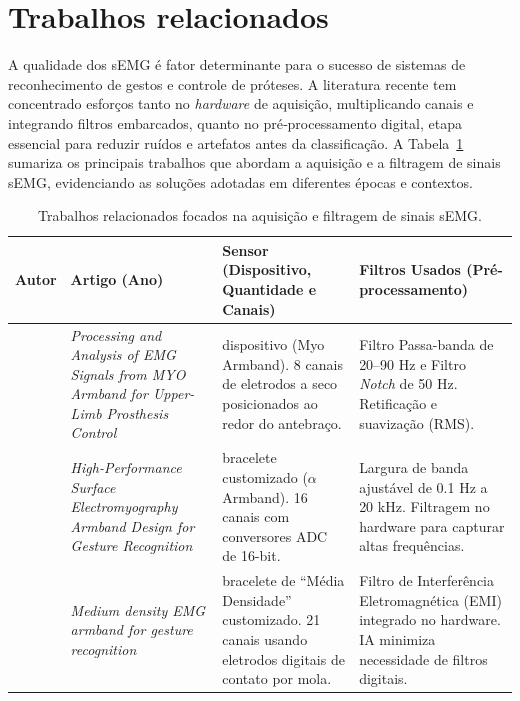 \section{Trabalhos relacionados}

A qualidade dos sEMG é fator determinante para o sucesso de sistemas de reconhecimento de gestos e controle de próteses. A literatura recente tem concentrado esforços tanto no \textit{hardware} de aquisição, multiplicando canais e integrando filtros embarcados, quanto no pré‑processamento digital, etapa essencial para reduzir ruídos e artefatos antes da classificação.
A Tabela~\ref{tab:aquisicao_semg} sumariza os principais trabalhos que abordam a aquisição e a filtragem de sinais sEMG, evidenciando as soluções adotadas em diferentes épocas e contextos.

\begin{table}[H]
    \centering
    \small
    \setlength{\extrarowheight}{3pt}
    \caption{Trabalhos relacionados focados na aquisição e filtragem de sinais sEMG.}
    \label{tab:aquisicao_semg}
    \begin{tabularx}{\textwidth}{@{} 
        >{\RaggedRight\arraybackslash}X 
        >{\RaggedRight\arraybackslash}X 
        >{\RaggedRight\arraybackslash}X 
        >{\RaggedRight\arraybackslash}X 
        @{}}
        \toprule
        \rowcolor{gray!20} \textbf{Autor} & \textbf{Artigo (Ano)} & \textbf{Sensor (Dispositivo, Quantidade e Canais)} & \textbf{Filtros Usados (Pré-processamento)} \\
        \midrule
        \citet{ProcessingAndAnalysisOfEMGSignalsFromMYO} & \textit{Processing and Analysis of EMG Signals from MYO Armband for Upper-Limb Prosthesis Control} & 1 dispositivo (Myo Armband). 8 canais de eletrodos a seco posicionados ao redor do antebraço. & Filtro Passa-banda de 20--90 Hz e Filtro \textit{Notch} de 50 Hz. Retificação e suavização (RMS). \\
        \midrule
        \citet{Zhang2023-gn} & \textit{High-Performance Surface Electromyography Armband Design for Gesture Recognition} & 1 bracelete customizado ($\alpha$ Armband). 16 canais com conversores ADC de 16-bit. & Largura de banda ajustável de 0.1 Hz a 20 kHz. Filtragem no hardware para capturar altas frequências. \\
        \midrule
        \citet{Aghchehli2025-te} & \textit{Medium density EMG armband for gesture recognition} & 1 bracelete de “Média Densidade” customizado. 21 canais usando eletrodos digitais de contato por mola. & Filtro de Interferência Eletromagnética (EMI) integrado no hardware. IA minimiza necessidade de filtros digitais. \\

\end{tabularx}
\end{table}
